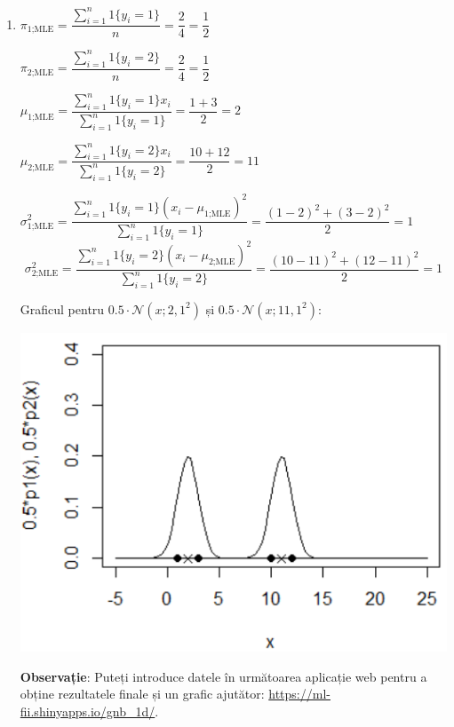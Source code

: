 \documentclass[12pt]{article}
\begin{document}
\begin{enumerate}
\begin{enumerate}
			
			\item 
			
			$\pi_\text{1;MLE} = \dfrac{\sum_{i=1}^{n}1\{y_i=1\}}{n} = \dfrac{2}{4} = \dfrac{1}{2}$
			
			$\pi_\text{2;MLE} = \dfrac{\sum_{i=1}^{n}1\{y_i=2\}}{n} = \dfrac{2}{4} = \dfrac{1}{2}$
			
			$\mu_\text{1;MLE} = \dfrac{\sum_{i=1}^n{1\{y_i=1\} x_i}}{{\sum_{i=1}^n}{1\{y_i=1\}}} = \dfrac{1+3}{2} = 2$
			
			$\mu_\text{2;MLE} = \dfrac{\sum_{i=1}^n{1\{y_i=2\} x_i}}{{\sum_{i=1}^n}{1\{y_i=2\}}} = \dfrac{10+12}{2} = 11$
			
			$\sigma^2_\text{1;MLE} = \dfrac{\sum_{i=1}^{n} 1\{y_i=1\} (x_i - \mu_\text{1;MLE})^2}{{\sum_{i=1}^n}{1\{y_i=1\}}} =\dfrac{(1-2)^2 + (3-2)^2}{2} = 1$
			$$\sigma^2_\text{2;MLE} = \dfrac{\sum_{i=1}^{n} 1\{y_i=2\} (x_i - \mu_\text{2;MLE})^2}{{\sum_{i=1}^n}{1\{y_i=2\}}} =\dfrac{(10-11)^2 + (12-11)^2}{2} = 1$$
			
			\newpage
			
			Graficul pentru $0.5 \cdot \mathcal{N}(x;2,1^2)$ și $0.5 \cdot \mathcal{N}(x;11,1^2)$:
			
			\begin{center}
				\includegraphics{screenshot010}
			\end{center}
			
			
			\textbf{Observație}: Puteți introduce datele în următoarea aplicație web pentru a obține rezultatele finale și un grafic ajutător: \url{https://ml-fii.shinyapps.io/gnb_1d/}.
			
		\end{enumerate}
		

\end{enumerate}
\end{document}
